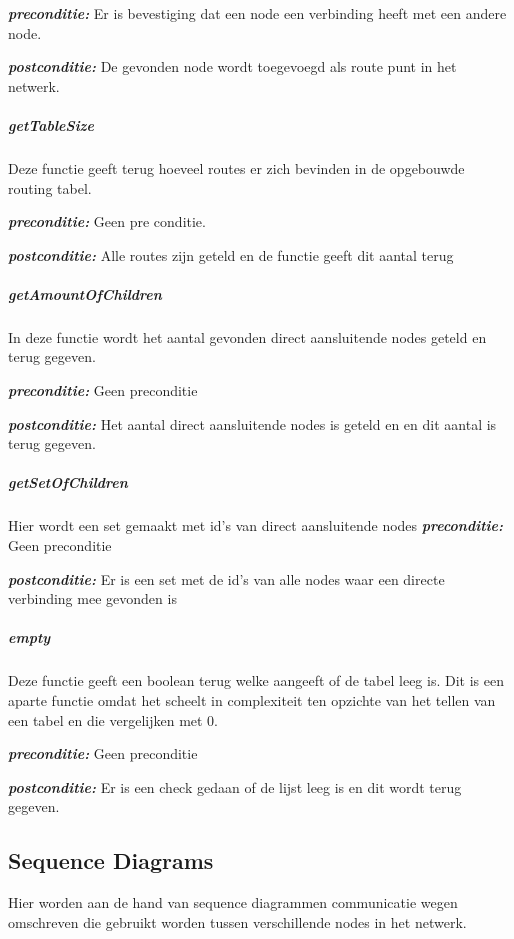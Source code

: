 \documentclass[a4paper, 11pt, oneside]{report}
\begin{document}
\textbf{\textit{preconditie:}}  Er is bevestiging dat een node een verbinding heeft met een andere node.

\textbf{\textit{postconditie:}}  De gevonden node wordt toegevoegd als route punt in het netwerk.


\subparagraph{getTableSize}
Deze functie geeft terug hoeveel routes er zich bevinden in de opgebouwde routing tabel.

\textbf{\textit{preconditie:}} Geen pre conditie.

\textbf{\textit{postconditie:}} Alle routes zijn geteld en de functie geeft dit aantal terug

\subparagraph{getAmountOfChildren}
In deze functie wordt het aantal gevonden direct aansluitende nodes geteld en terug gegeven.  

\textbf{\textit{preconditie:}}  Geen preconditie

\textbf{\textit{postconditie:}} Het aantal direct aansluitende nodes is geteld en en dit aantal is terug gegeven.

\subparagraph{getSetOfChildren}
Hier wordt een set gemaakt met id's van direct aansluitende nodes 
\textbf{\textit{preconditie:}} Geen preconditie

\textbf{\textit{postconditie:}} Er is een set met de id's van alle nodes waar een directe verbinding mee gevonden is

\subparagraph{empty}
Deze functie geeft een boolean terug welke aangeeft of de tabel leeg is.
Dit is een aparte functie omdat het scheelt in complexiteit ten opzichte van het tellen van een tabel en die vergelijken met 0.
  
\textbf{\textit{preconditie:}} Geen preconditie

\textbf{\textit{postconditie:}} Er is een check gedaan of de lijst leeg is en dit wordt terug gegeven.

\subsection{Sequence Diagrams}
\label{DetailedDesign:Communicatie:sequence}
Hier worden aan de hand van sequence diagrammen communicatie wegen omschreven die gebruikt worden tussen verschillende nodes in het netwerk.
\end{document}
